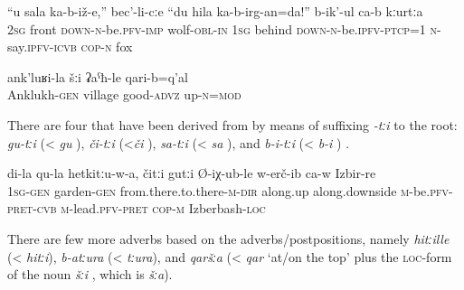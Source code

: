 \begin{exe}
	\ex	\label{ex:Now the fox says to the wolf you sit down in front}
	\gll	``u	sala	ka-b-iž-e,''		bec'-li-cːe	``du	hila	ka-b-irg-an=da!''	b-ik'-ul ca-b	kːurtːa  \\ 
		2\textsc{sg}	front	\textsc{down-n}-be.\textsc{pfv}-\textsc{imp}	wolf-\textsc{obl}-\textsc{in} 1\textsc{sg} behind \textsc{down-n}-be.\textsc{ipfv}-\textsc{ptcp}=1	\textsc{n}-say.\textsc{ipfv}-\textsc{icvb} \textsc{cop-n}	fox\\
	\glt	{}

	\ex	\label{ex:The village of Anklukh is pretty high up}
	\gll	ank'luʁi-la	šːi	ʡaˁħ-le	qari-b=q'al\\
		Anklukh-\textsc{gen}	village	good-\textsc{advz}	up-\textsc{n}=\textsc{mod}\\
	\glt	{}
\end{exe}

There are four  that have been derived from  by means of suffixing \textit{-tːi} to the root: \textit{gu-tːi}  (< \textit{gu} ), \textit{či-tːi}  (<\textit{či} ), \textit{sa-tːi}  (< \textit{sa} ), and \textit{b-i-tːi}  (< \textit{b-i} ) .
%
\begin{exe}
	\ex	\label{ex:Through my garden up down they brought him to Izberbash}
	\gll	di-la	qu-la	hetkitːu-w-a,	čitːi	gutːi	Ø-iχ-ub-le	w-erč-ib ca-w	Izbir-re\\
		1\textsc{sg-gen}	garden-\textsc{gen}	from.there.to.there-\textsc{m-dir}	along.up along.downside	\textsc{m}-be.\textsc{pfv-pret-cvb}	\textsc{m}-lead.\textsc{pfv}-\textsc{pret} \textsc{cop-m}	Izberbash-\textsc{loc}\\
	\glt	{}
\end{exe}

There are few more adverbs based on the adverbs/postpositions, namely \textit{hitːille}  (< \textit{hitːi}), \textit{b-atːura}  (< \textit{tːura}), and \textit{qaršːa}  (< \textit{qar} `at/on the top' plus the \textsc{loc}-form of the noun \textit{šːi} , which is \textit{šːa}).


